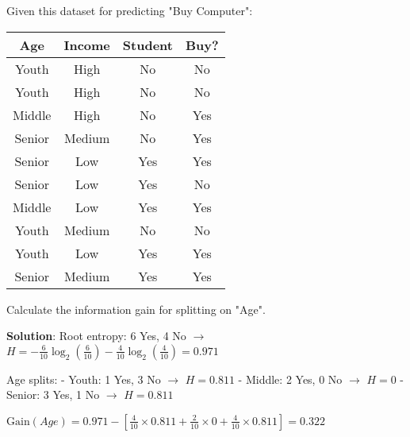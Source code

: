 \documentclass{article}
\newcounter{exercise}
\begin{document}
\begin{tcolorbox}[colback=gray!5!white,colframe=gray!75!black,title=Problem \stepcounter{exercise}\#\theexercise: Information Gain Calculation]

Given this dataset for predicting "Buy Computer":

\begin{center}
\begin{tabular}{|c|c|c|c|}
\hline
\textbf{Age} & \textbf{Income} & \textbf{Student} & \textbf{Buy?} \\
\hline
Youth & High & No & No \\
Youth & High & No & No \\
Middle & High & No & Yes \\
Senior & Medium & No & Yes \\
Senior & Low & Yes & Yes \\
Senior & Low & Yes & No \\
Middle & Low & Yes & Yes \\
Youth & Medium & No & No \\
Youth & Low & Yes & Yes \\
Senior & Medium & Yes & Yes \\
\hline
\end{tabular}
\end{center}

Calculate the information gain for splitting on "Age".

\textbf{Solution}:
Root entropy: 6 Yes, 4 No $\rightarrow$ $H = -\frac{6}{10}\log_2(\frac{6}{10}) - \frac{4}{10}\log_2(\frac{4}{10}) = 0.971$

Age splits:
- Youth: 1 Yes, 3 No $\rightarrow$ $H = 0.811$
- Middle: 2 Yes, 0 No $\rightarrow$ $H = 0$
- Senior: 3 Yes, 1 No $\rightarrow$ $H = 0.811$

$\text{Gain}(Age) = 0.971 - [\frac{4}{10} \times 0.811 + \frac{2}{10} \times 0 + \frac{4}{10} \times 0.811] = 0.322$
\end{tcolorbox}
\end{document}
